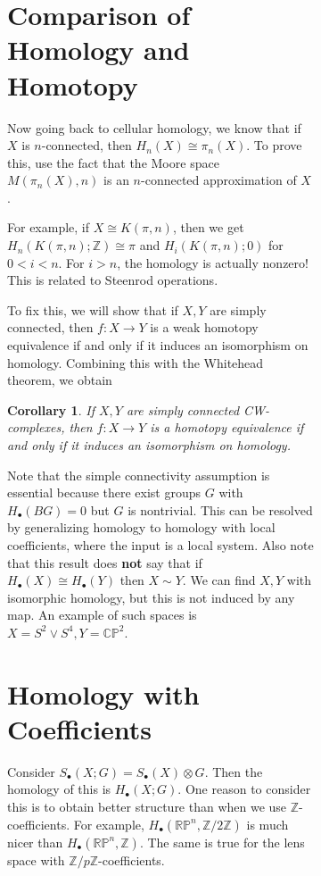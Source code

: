 \documentclass[leqno, openany]{memoir}
\newtheorem{cor}[thm]{Corollary}
\theoremstyle{definition}
\theoremstyle{remark}
\theoremstyle{plain}
\theoremstyle{definition}
\theoremstyle{remark}
\newcommand{\R}{\mathbb{R}}
\newcommand{\C}{\mathbb{C}}
\newcommand{\Z}{\mathbb{Z}}
\renewcommand{\P}{\mathbb{P}}
\begin{document}
\begin{figure}[H]
\begin{figure}[H]
\section{Comparison of Homology and Homotopy}%
\label{sec:comparison_of_homology_and_homotopy}

Now going back to cellular homology, we know that if $X$ is $n$-connected, then
$H_n(X) \cong \pi_n(X)$. To prove this, use the fact that the Moore space
$M(\pi_n(X), n)$ is an $n$-connected approximation of $X$.

For example, if $X \cong K(\pi, n)$, then we get $H_n(K(\pi, n); \Z) \cong \pi$
and $H_i(K(\pi, n); 0)$ for $0 < i < n$. For $i > n$, the homology is actually
nonzero! This is related to Steenrod operations.

To fix this, we will show that if $X,Y$ are simply connected, then $f \colon X
\to Y$ is a weak homotopy equivalence if and only if it induces an isomorphism
on homology. Combining this with the Whitehead theorem, we obtain

\begin{cor} If $X,Y$ are simply connected CW-complexes, then $f \colon X \to Y$
is a homotopy equivalence if and only if it induces an isomorphism on homology.
\end{cor}

Note that the simple connectivity assumption is essential because there exist
groups $G$ with $H_{\bullet}(BG) = 0$ but $G$ is nontrivial. This can be
resolved by generalizing homology to homology with local coefficients, where
the input is a local system. Also note that this result does \textbf{not} say
that if $H_{\bullet}(X) \cong H_{\bullet}(Y)$ then $X \sim Y$. We can find
$X,Y$ with isomorphic homology, but this is not induced by any map. An example
of such spaces is $X = S^2 \vee S^4, Y = \C\P^2$.

\section{Homology with Coefficients}%

Consider $S_{\bullet}(X;G) = S_{\bullet}(X) \otimes G$. Then the homology of
this is $H_{\bullet}(X;G)$. One reason to consider this is to obtain better
structure than when we use $\Z$-coefficients. For example, $H_{\bullet}(\R\P^n,
\Z/2\Z)$ is much nicer than $H_{\bullet}(\R\P^n, \Z)$. The same is true for the
lens space with $\Z/p\Z$-coefficients.


\end{figure}
\end{figure}
\end{document}
